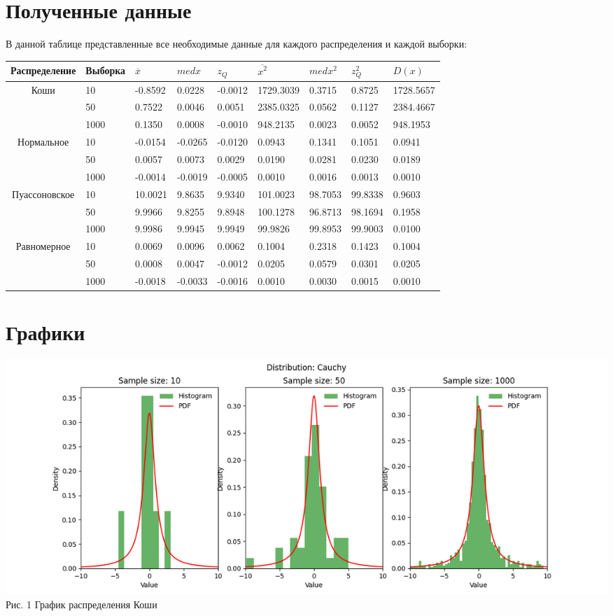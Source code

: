 \documentclass[12pt]{article}
\begin{document}
\section{Полученные данные}
В данной таблице представленные все необходимые данные для каждого распределения и каждой выборки:\\
\begin{tabular}{|c|l|l|l|l|l|l|l|l|}
	\hline
	Распределение & Выборка & $\overline{x}$ & $med x$  & $z_Q$ & $\overline{x^2}$ & $med x^2$ & $z_Q^2$ & $D(x)$ \\
	\hline
	Коши & 10 & -0.8592 & 0.0228 & -0.0012 & 1729.3039 & 0.3715 & 0.8725 & 1728.5657 \\
	\hline
	   \ & 50 & 0.7522 & 0.0046 & 0.0051 & 2385.0325 & 0.0562 & 0.1127 & 2384.4667 \\
	\hline
	   \ & 1000 & 0.1350 & 0.0008 & -0.0010 & 948.2135 & 0.0023 & 0.0052 & 948.1953 \\
	\hline
		Нормальное & 10 & -0.0154 & -0.0265 & -0.0120 & 0.0943 & 0.1341 & 0.1051 & 0.0941 \\
	\hline
		\ & 50 & 0.0057 & 0.0073 & 0.0029 & 0.0190 & 0.0281 & 0.0230 & 0.0189 \\
	\hline
		\ & 1000 & -0.0014 & -0.0019 & -0.0005 & 0.0010 & 0.0016 & 0.0013 & 0.0010 \\
	\hline
		Пуассоновское & 10 & 10.0021 & 9.8635 & 9.9340 & 101.0023 & 98.7053 & 99.8338 & 0.9603 \\
	\hline
		\ & 50 & 9.9966 & 9.8255 & 9.8948 & 100.1278 & 96.8713 & 98.1694 & 0.1958 \\
	\hline
		\ & 1000 & 9.9986 & 9.9945 & 9.9949 & 99.9826 & 99.8953 & 99.9003 & 0.0100 \\
	\hline
		Равномерное & 10 & 0.0069 & 0.0096 & 0.0062 & 0.1004 & 0.2318 & 0.1423 & 0.1004 \\
	\hline
		\ & 50 & 0.0008 & 0.0047 & -0.0012 & 0.0205 & 0.0579 & 0.0301 & 0.0205 \\
	\hline
		\ & 1000 & -0.0018 & -0.0033 & -0.0016 & 0.0010 & 0.0030 & 0.0015 & 0.0010 \\
	\hline

\end{tabular}

\section{Графики}

\begin{center}
    \includegraphics[scale=0.6]{lab_1_Cauchy.png} \\
    Рис. 1 График распределения Коши
\end{center}
\end{document}
